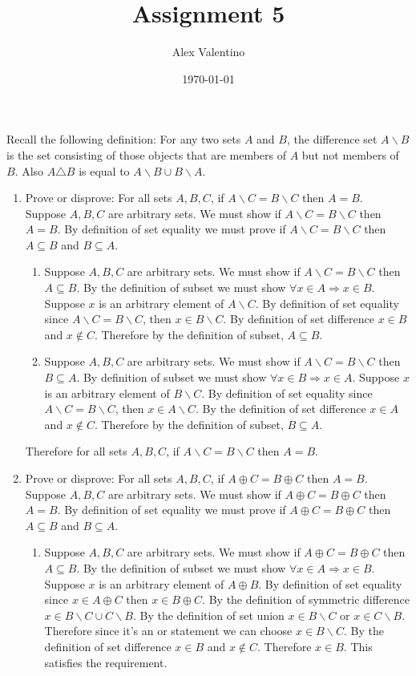 \documentclass[12pt, letterpaper]{article}
\date{\today}
\author{Alex Valentino}
\title{Assignment 5}
\begin{document}
Recall the following definition: For any two sets $A$ and $B$, the difference set $A \backslash B$ is the set consisting of those objects that are members of $A$ but not members of $B$. Also $A \triangle B$ is equal to $A \backslash B \cup B \backslash A$.
	\begin{enumerate}
	\item Prove or disprove: For all sets $A, B, C$, if $A \backslash C=B \backslash C$ then $A=B$.\\
	Suppose $A,B,C$ are arbitrary sets.  We must show if $A \backslash C=B \backslash C$ then $A=B$.  By definition of set equality we must prove if $A \backslash C=B \backslash C$ then $A\subseteq B$ and  $B\subseteq A$.
		\begin{enumerate}
			\item Suppose $A,B,C$ are arbitrary sets.  We must show if $A \backslash C=B \backslash C$ then $A \subseteq B$.  By the definition of subset we must show $\forall x \in A \Rightarrow x \in B$. Suppose $x$ is an arbitrary element of $A \backslash C.$  By definition of set equality since $A \backslash C=B \backslash C$, then $x \in B \backslash C.$  By definition of set difference $x \in B$ and $x \not\in C$.  Therefore by the definition of subset, $A \subseteq B$.
			\item Suppose $A,B,C$ are arbitrary sets.  We must show if $A \backslash C=B \backslash C$ then $B \subseteq A.$ By definition of subset we must show $\forall x \in B \Rightarrow x \in A$. Suppose $x$ is an arbitrary element of $B \backslash C.$  By definition of set equality since $A \backslash C=B \backslash C$, then $x \in A \backslash C.$ By the definition of set difference $x \in A$ and $x \not\in C$. Therefore by the definition of subset, $B \subseteq A$.
		\end{enumerate}
		Therefore for all sets $A, B, C$, if $A \backslash C=B \backslash C$ then $A=B$.
	\item Prove or disprove: For all sets $A, B, C$, if $A \oplus C=B \oplus C$ then $A=B$.\\
	Suppose $A,B,C$ are arbitrary sets.  We must show if $A \oplus C=B \oplus C$ then $A=B$.  By definition of set equality we must prove if $A \oplus C=B \oplus C$ then $A\subseteq B$ and  $B\subseteq A$.
	\begin{enumerate}
		\item Suppose $A,B,C$ are arbitrary sets.  We must show if $A \oplus C=B \oplus C$ then $A \subseteq B$. By the definition of subset we must show $\forall x \in A \Rightarrow x \in B$. Suppose $x$ is an arbitrary element of $A \oplus B.$  By definition of set equality since $x \in A \oplus C$ then $x \in B \oplus C.$  By the definition of symmetric difference $x \in B \backslash C \cup C \backslash B.$  By the definition of set union $x \in B \backslash C$ or $x \in C \backslash B.$  Therefore since it's an or statement we can choose $x \in B \backslash C$.  By the definition of set difference $x \in B$ and $x \not\in C.$  Therefore $x \in B.$  This satisfies the requirement. 

\end{enumerate}
\end{enumerate}
\end{document}
